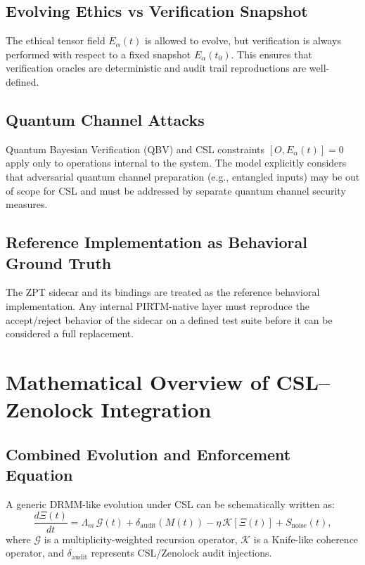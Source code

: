 \documentclass[11pt]{article}
\begin{document}
\subsection{Evolving Ethics vs Verification Snapshot}

The ethical tensor field $E_\alpha(t)$ is allowed to evolve, but verification is always performed with respect to a fixed snapshot $E_\alpha(t_0)$.
This ensures that verification oracles are deterministic and audit trail reproductions are well-defined.

\subsection{Quantum Channel Attacks}

Quantum Bayesian Verification (QBV) and CSL constraints $[O, E_\alpha(t)] = 0$ apply only to operations internal to the system.
The model explicitly considers that adversarial quantum channel preparation (e.g., entangled inputs) may be out of scope for CSL and must be addressed by separate quantum channel security measures.

\subsection{Reference Implementation as Behavioral Ground Truth}

The ZPT sidecar and its bindings are treated as the reference behavioral implementation.
Any internal PIRTM-native layer must reproduce the accept/reject behavior of the sidecar on a defined test suite before it can be considered a full replacement.

\section{Mathematical Overview of CSL--Zenolock Integration}

\subsection{Combined Evolution and Enforcement Equation}

A generic DRMM-like evolution under CSL can be schematically written as:
\begin{equation}
  \frac{d\Xi(t)}{dt}
    = \Lambda_m \, \mathcal{G}(t)
    + \delta_{\mathrm{audit}}(M(t))
    - \eta \, \mathcal{K}[\Xi(t)]
    + S_{\mathrm{noise}}(t),
\end{equation}
where $\mathcal{G}$ is a multiplicity-weighted recursion operator, $\mathcal{K}$ is a Knife-like coherence operator,
and $\delta_{\mathrm{audit}}$ represents CSL/Zenolock audit injections.
\end{document}
